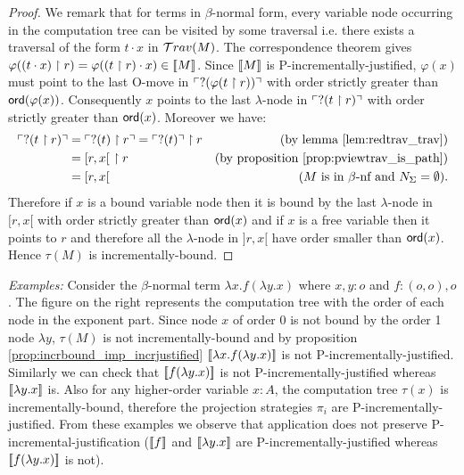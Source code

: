 \begin{proof}
We remark that for terms in $\beta$-normal form, every variable node
occurring in the computation tree can be visited by some traversal
i.e. there exists a traversal of the form $t \cdot x$ in
$\mathcal{T}rav(M)$. The correspondence theorem gives $\varphi((t \cdot x)
\upharpoonright r) = \varphi((t \upharpoonright r) \cdot x) \in
{[\![M ]\!]}$. Since ${[\![ M ]\!]}$ is P-incrementally-justified, $\varphi(x)$
must point to the last O-move in $\ulcorner ?(\varphi(t \upharpoonright
r)) \urcorner$ with order strictly greater than ${\sf ord}(\varphi(x))$.
Consequently $x$ points to the last $\lambda$-node in $\ulcorner ?(t
\upharpoonright r) \urcorner$ with order strictly greater than ${\sf ord}(x)$. Moreover we
have:
\begin{align*}
\ulcorner ?(t \upharpoonright r) \urcorner &= \ulcorner ?(t) \upharpoonright r \urcorner = \ulcorner ?(t) \urcorner \upharpoonright r & (\mbox{by lemma \ref{lem:redtrav_trav}}) \\
& = [r,x[\  \upharpoonright r & (\mbox{by proposition \ref{prop:pviewtrav_is_path}}) \\
& = [r,x[  & (\mbox{$M$ is in $\beta$-nf and $N_\Sigma = \emptyset$}). 
\end{align*}
Therefore if $x$ is a bound variable node then it is bound by the
last $\lambda$-node in $[r,x[$ with order strictly greater than
${\sf ord}(x)$ and if $x$ is a free variable then it points to $r$ and
therefore all the $\lambda$-node in $]r,x[$ have order smaller than
${\sf ord}(x)$. Hence $\tau(M)$ is incrementally-bound.
\end{proof}



\noindent \emph{Examples:} Consider the $\beta$-normal term $\lambda
x . f (\lambda y .x)$ where $x,y:o$ and $f:(o,o),o$. The figure on
the right represents the computation tree with the order of each
node in the exponent part. Since node $x$ of order $0$ is not bound
by the order 1 node $\lambda y$, $\tau(M)$ is not
incrementally-bound and by proposition
\ref{prop:incrbound_imp_incrjustified} ${[\![ \lambda x . f (\lambda
y .x) ]\!]}$ is not P-incrementally-justified. Similarly we can check that
${[\![ f (\lambda y .x) ]\!]}$ is not P-incrementally-justified
whereas ${[\![ \lambda y. x ]\!]}$ is.
Also for any higher-order variable $x:A$, the computation tree
$\tau(x)$ is incrementally-bound, therefore the projection
strategies $\pi_i$ are P-incrementally-justified. From these examples
we observe that application does not preserve
P-incremental-justification (${[\![ f ]\!]}$ and ${[\![ \lambda y. x ]\!]}$ are
P-incrementally-justified whereas ${[\![ f (\lambda y .x) ]\!]}$ is not).

